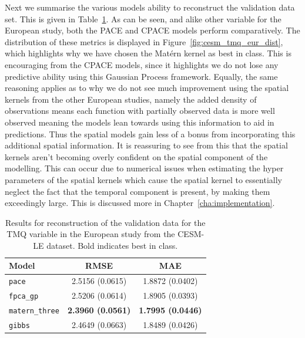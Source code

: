 Next we summarise the various models ability to reconstruct the validation data set.
This is given in Table~\ref{tab:train_cesm_tmq_eur}.
As can be seen, and alike other variable for the European study, both the PACE and CPACE models perform comparatively.
The distribution of these metrics is displayed in Figure~\ref{fig:cesm_tmq_eur_dist}, which highlights why we have chosen the Mat\'ern kernel as best in class.
This is encouraging from the CPACE models, since it highlights we do not lose any predictive ability using this Gaussian Process framework.
Equally, the same reasoning applies as to why we do not see much improvement using the spatial kernels from the other European studies, namely the added density of observations means each function with partially observed data is more well observed meaning the models lean towards using this information to aid in predictions.
Thus the spatial models gain less of a bonus from incorporating this additional spatial information.
It is reassuring to see from this that the spatial kernels aren't becoming overly confident on the spatial component of the modelling.
This can occur due to numerical issues when estimating the hyper parameters of the spatial kernels which cause the spatial kernel to essentially neglect the fact that the temporal component is present, by making them exceedingly large.
This is discussed more in Chapter~\ref{cha:implementation}.

\begin{table}
	\caption[Results for TMQ variable on validation data in the European study]{Results for reconstruction of the validation data for the TMQ variable in the European study from the CESM-LE dataset. Bold indicates best in class.}
	\centering
	\label{tab:train_cesm_tmq_eur}
	\begin{tabular}{lcc}
		\toprule
		\textbf{Model} & \textbf{RMSE} & \textbf{MAE} \\
		\midrule
		\verb*|pace| & 2.5156 (0.0615) & 1.8872	(0.0402) \\
		\verb*|fpca_gp| & 2.5206 (0.0614) & 1.8905 (0.0393) \\
		\verb*|matern_three| & \textbf{2.3960 (0.0561)} & \textbf{1.7995 (0.0446)}\\
		\verb*|gibbs| & 2.4649 (0.0663) & 1.8489 (0.0426)\\
		\bottomrule
	\end{tabular}
\end{table}



